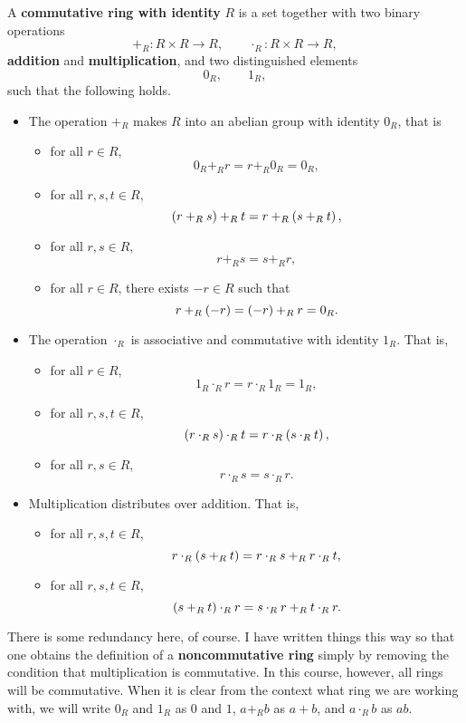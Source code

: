 \begin{definition}
A \textbf{commutative ring with identity} $ R $ is a set together with two binary operations
$$ +_R : R \times R \to R, \qquad \cdot_R : R \times R \to R, $$
\textbf{addition} and \textbf{multiplication}, and two distinguished elements
$$ 0_R, \qquad 1_R, $$
such that the following holds.
\begin{itemize}
\item The operation $ +_R $ makes $ R $ into an abelian group with identity $ 0_R $, that is
\begin{itemize}
\item for all $ r \in R $,
$$ 0_R +_R r = r +_R 0_R = 0_R, $$
\item for all $ r, s, t \in R $,
$$ \br{r +_R s} +_R t = r +_R \br{s +_R t}, $$
\item for all $ r, s \in R $,
$$ r +_R s = s +_R r, $$
\item for all $ r \in R $, there exists $ -r \in R $ such that
$$ r +_R \br{-r} = \br{-r} +_R r = 0_R. $$
\end{itemize}
\item The operation $ \cdot_R $ is associative and commutative with identity $ 1_R $. That is,
\begin{itemize}
\item for all $ r \in R $,
$$ 1_R \cdot_R r = r \cdot_R 1_R = 1_R, $$
\item for all $ r, s, t \in R $,
$$ \br{r \cdot_R s} \cdot_R t = r \cdot_R \br{s \cdot_R t}, $$
\item for all $ r, s \in R $,
$$ r \cdot_R s = s \cdot_R r. $$
\end{itemize}
\item Multiplication distributes over addition. That is,
\begin{itemize}
\item for all $ r, s, t \in R $,
$$ r \cdot_R \br{s +_R t} = r \cdot_R s +_R r \cdot_R t, $$
\item for all $ r, s, t \in R $,
$$ \br{s +_R t} \cdot_R r = s \cdot_R r +_R t \cdot_R r. $$
\end{itemize}
\end{itemize}
\end{definition}

There is some redundancy here, of course. I have written things this way so that one obtains the definition of a \textbf{noncommutative ring} simply by removing the condition that multiplication is commutative. In this course, however, all rings will be commutative. When it is clear from the context what ring we are working with, we will write $ 0_R $ and $ 1_R $ as $ 0 $ and $ 1 $, $ a +_R b $ as $ a + b $, and $ a \cdot_R b $ as $ ab $.

